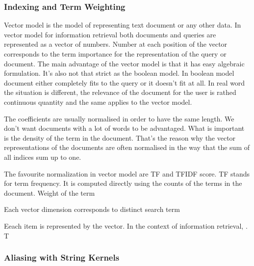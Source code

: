 \subsubsection{Indexing and Term Weighting}
\label{sec:indexing_term_weighting}

Vector model is the model of representing text document or any other data. In vector model for information retrieval both documents and queries are represented as a vector of numbers. Number at each position of the vector corresponds to the term importance for the representation of the query or document. The main advantage of the vector model is that it has easy algebraic formulation. It's also not that strict as the boolean model. In boolean model document either completely fits to the query or it doesn't fit at all. In real word the situation is different, the relevance of the document for the user is rathed continuous quantity and the same applies to the vector model.

The coefficients are usually normalised in order to have the same length. We don't want documents with a lot of words to be advantaged. What is important is the density of the term in the document. That's the reason why the vector representations of the documents are often normalised in the way that the sum of all indices sum up to one. 

The favourite normalization in vector model are TF and TFIDF score. TF stands for term frequency. It is computed directly using the counts of the terms in the document. Weight of the term 

 Each vector dimension corresponds to distinct search term 

 Eeach item is represented by the vector. In the context of information retrieval, . T

\subsubsection {Aliasing with String Kernels}
\label{sec:aliasing_string_kernel}
